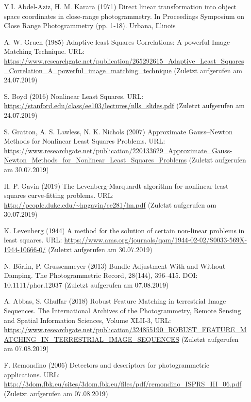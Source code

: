 \documentclass[12pt,oneside]{scrreprt}
\begin{document}
\begin{thebibliography}{10}
 Y.I. Abdel-Aziz, H. M. Karara (1971) Direct linear transformation into object space coordinates in close-range photogrammetry. In Proceedings Symposium on Close Range Photogrammetry (pp. 1-18). Urbana, Illinois

 A. W. Gruen (1985) Adaptive least Squares Correlations:
A powerful Image Matching Technique. URL: \url{https://www.researchgate.net/publication/265292615_Adaptive_Least_Squares_Correlation_A_powerful_image_matching_technique}  (Zuletzt aufgerufen am 24.07.2019)

 S. Boyd (2016) Nonlinear Least Squares. URL: \url{https://stanford.edu/class/ee103/lectures/nlls_slides.pdf} (Zuletzt aufgerufen am 24.07.2019)

 S. Gratton, A. S. Lawless, N. K. Nichols (2007) Approximate Gauss–Newton Methods for Nonlinear Least Squares Problems. URL: \url{https://www.researchgate.net/publication/220133629_Approximate_Gauss-Newton_Methods_for_Nonlinear_Least_Squares_Problems} (Zuletzt aufgerufen am 30.07.2019)

 H. P. Gavin (2019) The Levenberg-Marquardt algorithm for
nonlinear least squares curve-fitting problems. URL: \url{http://people.duke.edu/~hpgavin/ce281/lm.pdf} (Zuletzt aufgerufen am 30.07.2019)

 K. Levenberg (1944) A method for the solution of certain non-linear problems in least squares. URL: \url{https://www.ams.org/journals/qam/1944-02-02/S0033-569X-1944-10666-0/} (Zuletzt aufgerufen am 30.07.2019)

 N. Börlin, P. Grussenmeyer (2013) Bundle Adjustment With and Without Damping. The Photogrammetric Record, 28(144), 396–415. DOI: 10.1111/phor.12037 (Zuletzt aufgerufen am 07.08.2019)

 A. Abbas, S. Ghuffar (2018) Robust Feature Matching in terrestrial Image Sequences. The International Archives of the Photogrammetry, Remote Sensing and Spatial Information Sciences, Volume XLII-3, URL: \url{https://www.researchgate.net/publication/324855190_ROBUST_FEATURE_MATCHING_IN_TERRESTRIAL_IMAGE_SEQUENCES} (Zuletzt aufgerufen am 07.08.2019)

 F. Remondino (2006) Detectors and descriptors for photogrammetric applications. URL: \url{http://3dom.fbk.eu/sites/3dom.fbk.eu/files/pdf/remondino_ISPRS_III_06.pdf} (Zuletzt aufgerufen am 07.08.2019)


\end{thebibliography}
\end{document}
